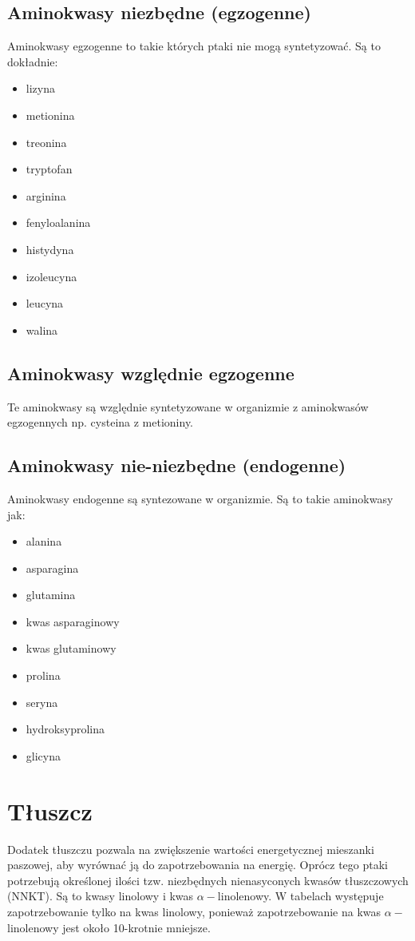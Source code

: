\documentclass[shortabstract]{iithesis}
\begin{document}
\subsection{Aminokwasy niezbędne (egzogenne)}
Aminokwasy egzogenne to takie których ptaki nie mogą syntetyzować. Są to dokładnie:
\begin{itemize}
\item lizyna
\item metionina
\item treonina
\item tryptofan
\item arginina
\item fenyloalanina
\item histydyna
\item izoleucyna
\item leucyna
\item walina
\end{itemize}

\subsection{Aminokwasy względnie egzogenne}
Te aminokwasy są względnie syntetyzowane w organizmie z aminokwasów egzogennych np. cysteina z metioniny.

\subsection{Aminokwasy nie-niezbędne (endogenne)}
Aminokwasy endogenne są syntezowane w organizmie. Są to takie aminokwasy jak:
\begin{itemize}
\item alanina
\item asparagina
\item glutamina
\item kwas asparaginowy
\item kwas glutaminowy
\item prolina
\item seryna
\item hydroksyprolina
\item glicyna
\end{itemize}


\section{Tłuszcz}
Dodatek tłuszczu pozwala na zwiększenie wartości energetycznej mieszanki paszowej, aby wyrównać ją do zapotrzebowania na energię.
Oprócz tego ptaki potrzebują określonej ilości tzw. niezbędnych nienasyconych kwasów tłuszczowych (NNKT). Są to kwasy linolowy i kwas $\alpha-$linolenowy.
W tabelach występuje zapotrzebowanie tylko na kwas linolowy, ponieważ zapotrzebowanie na kwas $\alpha-$linolenowy jest około 10-krotnie mniejsze.
\end{document}
